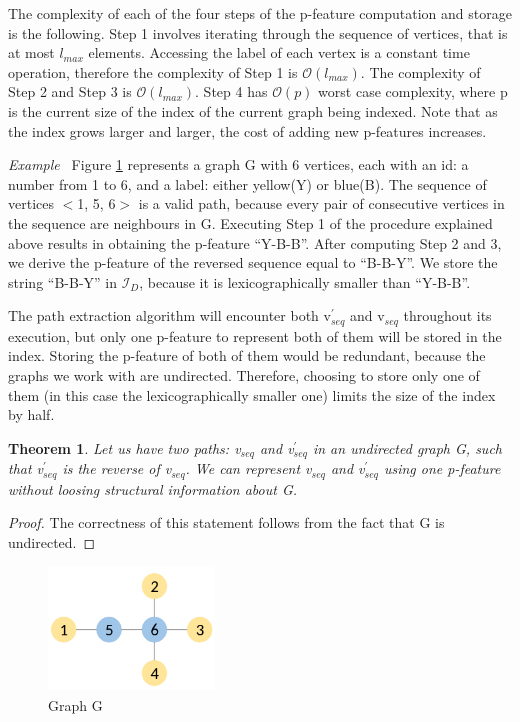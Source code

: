 \documentclass{l4proj}
\newcounter{example}[section]
\newenvironment{example}[1][]{\refstepcounter{example}\par\medskip
   \noindent \textit{Example~\theexample #1} \rmfamily}{\medskip}
\newtheorem{theorem}{Theorem}[section]
\newcommand{\fancyI}{\mathcal{I}}
\begin{document}
The complexity of each of the four steps of the p-feature computation and storage is the following. Step 1 involves iterating through the sequence of vertices, that is at most $l_{max}$ elements. Accessing the label of each vertex is a constant time operation, therefore the complexity of Step 1 is $\mathcal{O}(l_{max})$. The complexity of Step 2 and Step 3 is $\mathcal{O}(l_{max})$. Step 4 has $\mathcal{O}(p)$ worst case complexity, where p is the current size of the index of the current graph being indexed. Note that as the index grows larger and larger, the cost of adding new p-features increases.

\begin{example}
Figure \ref{C2H4-1} represents a graph G with 6 vertices, each with an id: a number from 1 to 6, and a label: either yellow(Y) or blue(B). The sequence of vertices $<$1, 5, 6$>$ is a valid path, because every pair of consecutive vertices in the sequence are neighbours in G. Executing Step 1 of the procedure explained above results in obtaining the p-feature ``Y-B-B''. After computing Step 2 and 3, we derive the p-feature of the reversed sequence equal to ``B-B-Y''. We store the string ``B-B-Y'' in $\fancyI_{D}$, because it is lexicographically smaller than ``Y-B-B''.
\end{example}

The path extraction algorithm will encounter both v$_{seq}^{\prime}$ and v$_{seq}$ throughout its execution, but only one p-feature to represent both of them will be stored in the index. Storing the p-feature of both of them would be redundant, because the graphs we work with are undirected. Therefore, choosing to store only one of them (in this case the lexicographically smaller one) limits the size of the index by half.

\begin{theorem}
Let us have two paths: v$_{seq}$ and v$_{seq}^{\prime}$ in an undirected graph G, such that v$_{seq}^{\prime}$ is the reverse of v$_{seq}$. We can represent v$_{seq}$ and v$_{seq}^{\prime}$ using one p-feature without loosing structural information about G. 
\end{theorem}

\begin{proof}
The correctness of this statement follows from the fact that G is undirected. 
\end{proof}

\begin{figure}
\centering
\begin{minipage}[t]{.5\textwidth}
  \centering
  \includegraphics[height=3.3cm,width=4.4cm]{images/graphs/C2H4-1.png}
  \caption{Graph G}
  \label{C2H4-1}
\end{minipage}
\end{figure}
\end{document}
